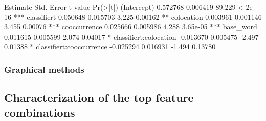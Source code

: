                          Estimate Std. Error t value Pr(>|t|)    
(Intercept)               0.572768   0.006419  89.229  < 2e-16 ***
classifiert               0.050648   0.015703   3.225  0.00162 ** 
colocation                0.003961   0.001146   3.455  0.00076 ***
cooccurrence              0.025666   0.005986   4.288 3.65e-05 ***
base_word                 0.011615   0.005599   2.074  0.04017 *  
classifiert:colocation   -0.013670   0.005475  -2.497  0.01388 *  
classifiert:cooccurrence -0.025294   0.016931  -1.494  0.13780  






\subsubsection{Graphical methods}





\subsection{Characterization of the top feature combinations}
